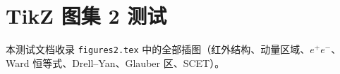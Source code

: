 

\chapter{TikZ 图集 2 测试}
本测试文档收录 \texttt{figures2.tex} 中的全部插图（红外结构、动量区域、$e^+e^-$、Ward 恒等式、Drell--Yan、Glauber 区、SCET）。


